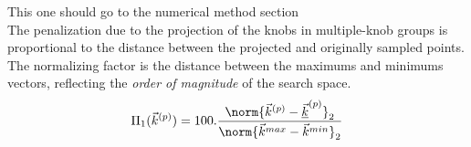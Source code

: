 \color{red} This one should go to the numerical method section \color{black}\\
The penalization due to the projection of the knobs in multiple-knob groups is proportional to the distance between the projected and originally sampled points.
The normalizing factor is the distance between the maximums and minimums vectors, reflecting the \emph{order of magnitude} of the search space.
\begin{equation*}
	\Pi_{1}(\vec{k}^{(p)})=100.\frac{\norm{\vec{k}^{(p)}-\underline{\vec{k}}^{(p)}}_{2}}{\norm{\vec{k}^{max}-\vec{k}^{min}}_{2}}
\end{equation*}
